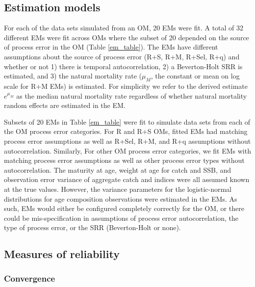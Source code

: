 \documentclass[
  12pt,
]{article}
\begin{document}
\subsection*{Estimation models}\label{estimation-models}

For each of the data sets simulated from an OM, 20 EMs were fit. A total
of 32 different EMs were fit across OMs where the subset of 20 depended
on the source of process error in the OM (Table \ref{em_table}). The EMs
have different assumptions about the source of process error (R+S, R+M,
R+Sel, R+q) and whether or not 1) there is temporal autocorrelation, 2)
a Beverton-Holt SRR is estimated, and 3) the natural mortality rate
(\(\mu_M\), the constant or mean on log scale for R+M EMs) is estimated.
For simplicity we refer to the derived estimate \(e^{\mu_M}\) as the
median natural mortality rate regardless of whether natural mortality
random effects are estimated in the EM.

Subsets of 20 EMs in Table \ref{em_table} were fit to simulate data sets
from each of the OM process error categories. For R and R+S OMs, fitted
EMs had matching process error assumptions as well as R+Sel, R+M, and
R+q assumptions without autocorrelation. Similarly, For other OM process
error categories, we fit EMs with matching process error assumptions as
well as other process error types without autocorrelation. The maturity
at age, weight at age for catch and SSB, and observation error variance
of aggregate catch and indices were all assumed known at the true
values. However, the variance parameters for the logistic-normal
distributions for age composition observations were estimated in the
EMs. As such, EMs would either be configured completely correctly for
the OM, or there could be mis-specification in assumptions of process
error autocorrelation, the type of process error, or the SRR
(Beverton-Holt or none).

\subsection*{Measures of reliability}\label{measures-of-reliability}

\subsubsection*{Convergence}\label{convergence}
\end{document}
